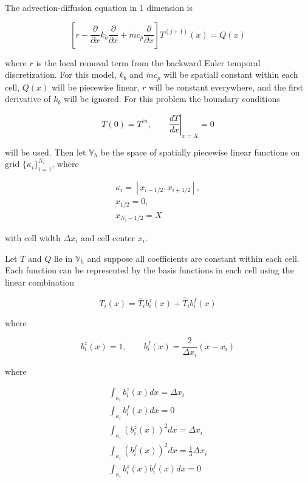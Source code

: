 \documentclass{proposal}
\newcommand{\ddx}{\ensuremath{\frac{\partial}{\partial x}}}
\begin{document}
\begin{appendices}
The advection-diffusion equation in 1 dimension is

\begin{equation}
    \left[ r - \ddx k_b \ddx + \dot{m}c_p \ddx \right]T^{(j+1)}(x) = Q(x)
\end{equation}

where $r$ is the local removal term from the backward Euler temporal discretization. For this model, $k_b$ and $\dot{m}c_p$ will be spatiall constant within each cell, $Q(x)$ will be piecewise linear, $r$ will be constant everywhere, and the first derivative of $k_b$ will be ignored. For this problem the boundary conditions 

\begin{equation}
    T(0) = T^{in}, \qquad \left.\frac{d T}{dx}\right|_{x=X} = 0
\end{equation}


will be used. Then let $\mathbb{V}_h$ be the space of spatially piecewise linear functions on grid $\{\kappa_i \}_{i=1}^{N_i}$, where

\begin{gather}
    \kappa_i = [x_{i-1/2}, x_{i+1/2}],\\
    x_{1/2} = 0,\\
    x_{N_i - 1/2} = X
\end{gather}

with cell width $\Delta x_i$ and cell center $x_i$.

Let $T$ and $Q$ lie in $\mathbb{V}_h$ and suppose all coefficients are constant within each cell. Each function can be represented by the basis functions in each cell using the linear combination

\begin{equation}
    T_i(x) = \overline{T}_i {b}^z_i(x) + \hat{T}_i{b}^f_i(x)
\end{equation}

where

\begin{equation}
    {b}^z_i(x) = 1, \qquad {b}^f_i(x) = \frac{2}{\Delta x_i}(x - x_i)
\end{equation}

where 

\begin{gather}
    \int_{\kappa_i} {b}^z_i(x)dx = \Delta x_i\\
    \int_{\kappa_i}{b}^f_i(x) dx = 0\\
    \int_{\kappa_i}({b}^z_i(x))^2 dx = \Delta x_i\\
    \int_{\kappa_i}({b}^f_i(x))^2 dx = \frac{1}{3}\Delta x_i\\
    \int_{\kappa_i}{b}^z_i(x){b}^f_i(x) dx =0
\end{gather}




\end{appendices}
\end{document}
